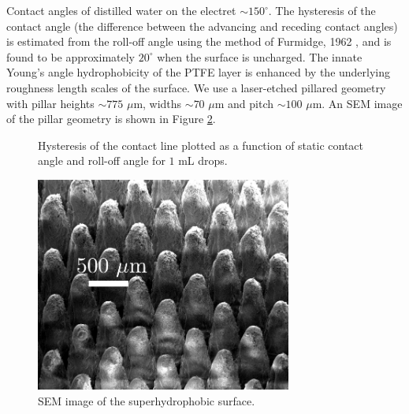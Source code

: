 \documentclass[12pt,a4paper,oneside]{book}
\begin{document}
Contact angles of distilled water on the electret $\sim 150^{\circ}$. The hysteresis of the contact angle (the difference between the advancing and receding contact angles) is estimated from the roll-off angle using the method of Furmidge, 1962 \cite{furmidge_studies_1962}, and is found to be approximately $20^{\circ}$ when the surface is uncharged. The innate Young's angle hydrophobicity of the PTFE layer is enhanced by the underlying roughness length scales of the surface. We use a laser-etched pillared geometry with pillar heights $\sim 775$ $\mu$m, widths $\sim 70$ $\mu$m and pitch $\sim 100$ $\mu$m. An SEM image of the pillar geometry is shown in Figure \ref{fig:SEM}.
\begin{figure}
    \centering
    
       \caption{Hysteresis of the contact line plotted as a function of static contact angle and roll-off angle for $1$ mL drops.\label{fig:hysteresis}}
\end{figure}

\begin{figure}[ht]
 \centering
 \includegraphics[width=0.75\textwidth]{../figures/SEM.pdf}
 \caption{SEM image of the superhydrophobic surface.\label{fig:SEM}}
\end{figure}
\end{document}
